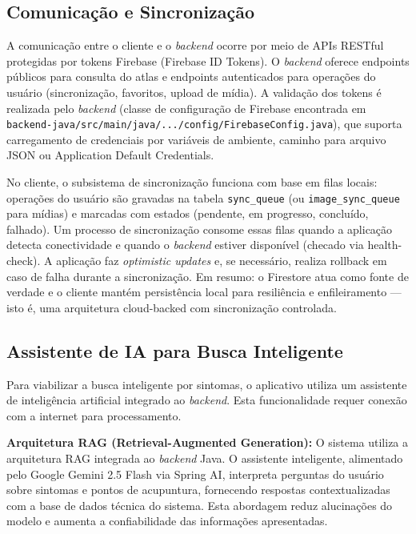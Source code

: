 \subsection{Comunicação e Sincronização}

A comunicação entre o cliente e o \textit{backend} ocorre por meio de APIs RESTful protegidas por tokens Firebase (Firebase ID Tokens). O \textit{backend} oferece endpoints públicos para consulta do atlas e endpoints autenticados para operações do usuário (sincronização, favoritos, upload de mídia). A validação dos tokens é realizada pelo \textit{backend} (classe de configuração de Firebase encontrada em \texttt{backend-java/src/main/java/.../config/FirebaseConfig.java}), que suporta carregamento de credenciais por variáveis de ambiente, caminho para arquivo JSON ou Application Default Credentials.

No cliente, o subsistema de sincronização funciona com base em filas locais: operações do usuário são gravadas na tabela \texttt{sync\_queue} (ou \texttt{image\_sync\_queue} para mídias) e marcadas com estados (pendente, em progresso, concluído, falhado). Um processo de sincronização consome essas filas quando a aplicação detecta conectividade e quando o \textit{backend} estiver disponível (checado via health-check). A aplicação faz \textit{optimistic updates} e, se necessário, realiza rollback em caso de falha durante a sincronização. Em resumo: o Firestore atua como fonte de verdade e o cliente mantém persistência local para resiliência e enfileiramento — isto é, uma arquitetura cloud-backed com sincronização controlada.

\subsection{Assistente de IA para Busca Inteligente}

Para viabilizar a busca inteligente por sintomas, o aplicativo utiliza um assistente de inteligência artificial integrado ao \textit{backend}. Esta funcionalidade requer conexão com a internet para processamento.

\textbf{Arquitetura RAG (Retrieval-Augmented Generation):}
O sistema utiliza a arquitetura RAG integrada ao \textit{backend} Java. O assistente inteligente, alimentado pelo Google Gemini 2.5 Flash via Spring AI, interpreta perguntas do usuário sobre sintomas e pontos de acupuntura, fornecendo respostas contextualizadas com a base de dados técnica do sistema. Esta abordagem reduz alucinações do modelo e aumenta a confiabilidade das informações apresentadas.

